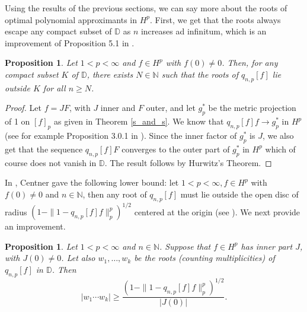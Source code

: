 \documentclass{article}
\theoremstyle{plain}
\numberwithin{Theorem}{section}
\numberwithin{equation}{section}
\theoremstyle{plain}
\newtheorem{Proposition}[Theorem]{Proposition}
\theoremstyle{definition}
\renewcommand{\geq}{\geqslant}
\newcommand{\N}{\mathbb{N}}
\begin{document}
 Using the results of the previous sections, we can say more about the roots of optimal polynomial approximants in $H^p$. First, we get that the roots always escape any compact subset of $\mathbb{D}$ as $n$ increases ad infinitum, which is an improvement of Proposition 5.1 in \cite{CCF}.
\begin{Proposition}\label{esc}
    Let $1 < p < \infty$ and $f \in H^p$ with $f(0) \neq 0$. Then, for any compact subset $K$ of $\mathbb{D}$, there exists $N\in\N$ such that the roots of $q_{n,p}[f]$ lie outside $K$ for all $n\geq N$.
\end{Proposition}
\begin{proof}
    Let $f = J F$, with $J$ inner and $F$ outer, and let $g_p^*$ be the metric projection of 1 on $[f]_p$ as given in Theorem \ref{s_and_s}. We know that $q_{n,p}[f]f\to g_p^*$ in $H^p$ (see for example Proposition 3.0.1 in \cite{ChengFelder}). Since the inner factor of $g_p^*$ is $J$, we also get that the sequence $q_{n,p}[f]F$ converges to the outer part of $g_p^*$ in $H^p$ which of course does not vanish in $\mathbb{D}$. The result follows by Hurwitz's Theorem.
\end{proof}
In \cite{Cent}, Centner gave the following lower bound: let $1 < p < \infty,f \in H^p$ with $f(0) \neq 0$ and $n\in\mathbb{N}$, then any root of $q_{n,p}[f]$ must lie outside the open disc of radius $(1-\|1-q_{n,p}[f]f\|_p^p)^{1/2}$ centered at the origin (see \cite[Proposition 5.1]{Cent}). We next provide an improvement.
\begin{Proposition}\label{opa_roots_prop}
Let $1 < p < \infty$ and $n\in\N$. Suppose that $f \in H^p$ has inner part $J$, with $J(0) \neq 0$. Let also $w_1,\dots,w_k$ be the roots (counting multiplicities) of $q_{n,p}[f]$ in $\mathbb{D}$. Then
\begin{equation}\label{lower_bound_zeros}
|w_1\cdots w_k| \geq \frac{(1 - \|1 - q_{n,p}[f]f\|_p^p)^{1/2}}{|J(0)|}.
\end{equation}
\end{Proposition}
\end{document}
